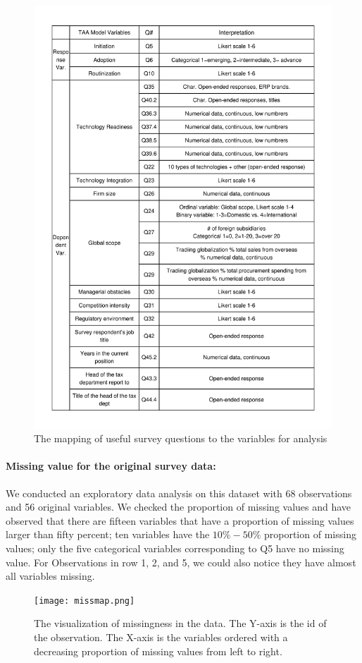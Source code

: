 \documentclass[12pt]{article}
\begin{document}
\begin{figure} [!hb]
 \centering 
 \includegraphics[width = .85\textwidth]{Mis/dat_Table.pdf}
 \caption{The mapping of useful survey questions to the variables for analysis }
 \label{fig:dat}
\end{figure}

\paragraph{Missing value for the original survey data:} 
We conducted an exploratory data analysis on this dataset with 68 observations and 56 original variables. We checked the proportion of missing values and have observed that there are fifteen variables that have a proportion of missing values larger than fifty percent; ten variables have the $10\%-50\%$ proportion of missing values; only the five categorical variables corresponding to Q5 have no missing value.  For Observations in row 1, 2, and 5, we could also notice they have almost all variables missing.


\begin{figure}[!h]
\centering
\texttt{[image: missmap.png]}
\caption{The visualization of missingness in the data. The Y-axis is the id of the observation. The X-axis is the variables ordered with a decreasing proportion of missing values from left to right.}
\label{fig:missmap}
\end{figure}
\end{document}
